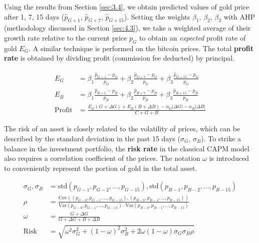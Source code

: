 \documentclass{mcmthesis}
\begin{document}
	Using the results from Section \ref{sec:3.4}, we obtain predicted values of gold price after 1, 7, 15 days ($\hat{p}_{G+1}$, $\hat{p}_{G+7}$, $\hat{p}_{G+15}$). Setting the weights $\beta_1$, $\beta_2$, $\beta_3$ with AHP (methodology discussed in Section \ref{sec:4.3}), we take a weighted average of their growth rate relative to the current price $p_G$ to obtain an \textit{expected} profit rate of gold $E_G$. A similar technique is performed on the bitcoin prices. The total \textbf{profit rate} is obtained by dividing profit (commission fee deducted) by principal. 
	
	\begin{align}
		E_G & = \beta_1 \frac{\hat{p}_{G+1}-p_G}{p_G} + \beta_2 \frac{\hat{p}_{G+7}-p_G}{p_G} + \beta_3 \frac{\hat{p}_{G+15}-p_G}{p_G} \\
		E_B & = \beta_1 \frac{\hat{p}_{B+1}-p_B}{p_B} + \beta_2 \frac{\hat{p}_{B+7}-p_B}{p_B} + \beta_3 \frac{\hat{p}_{B+15}-p_B}{p_B} \\
		\textrm{Profit} & = \frac {E_G\left(G+\Delta G\right) + E_B\left(B+\Delta B\right) - \alpha_G|\Delta G| - \alpha_B|\Delta B|} {C+G+B}
	\end{align}
	
	The risk of an asset is closely related to the volatility of prices, which can be described by the standard deviation in the past 15 days ($\sigma_G$, $\sigma_B$). To strike a balance in the investment portfolio, the \textbf{risk rate} in the classical CAPM model also requires a correlation coefficient of the prices. The notation $\omega$ is introduced to conveniently represent the portion of gold in the total asset. 
	
	\begin{align}
		\sigma_G, \sigma_B & = \textrm{std} \left(p_{G-1}, p_{G-2}, \ldots, p_{G-15}\right), \textrm{std} \left(p_{B-1}, p_{B-2}, \ldots, p_{B-15}\right) \\
		\rho & = \frac {\textrm{Cov}\left(\left(p_{G-0}, p_{G-1}, \ldots, p_{G-15}\right), \left(p_{B-0}, p_{B-1}, \ldots, p_{B-15}\right)\right)} {\textrm{Var}\left(p_{G-0}, p_{G-1}, \ldots, p_{G-15}\right) \cdot \textrm{Var}\left(p_{B-0}, p_{B-1}, \ldots, p_{B-15}\right)} \\
		\omega & = \frac {G+\Delta G} {G+\Delta G+B+\Delta B} \\
		\textrm{Risk} & = {\sqrt{\omega^2 \sigma_G^2 + \left(1-\omega\right)^2 \sigma_B^2 + 2 \omega \left(1-\omega\right) \sigma_G \sigma_B \rho}}
	\end{align}
\end{document}
